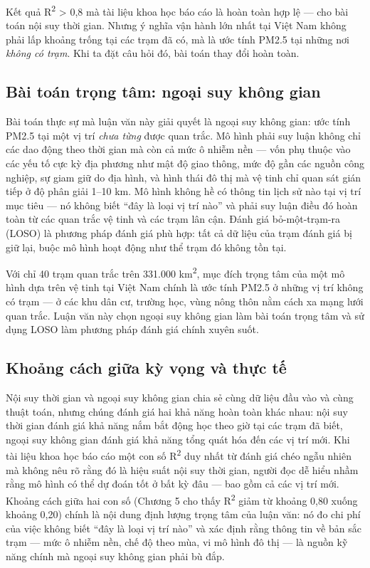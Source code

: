 Kết quả R\textsuperscript{2} > 0,8 mà tài liệu khoa học báo cáo là hoàn toàn hợp lệ --- cho bài toán nội suy thời gian. Nhưng ý nghĩa vận hành lớn nhất tại Việt Nam không phải lấp khoảng trống tại các trạm đã có, mà là ước tính PM2.5 tại những nơi \emph{không có trạm}. Khi ta đặt câu hỏi đó, bài toán thay đổi hoàn toàn.

\subsection{Bài toán trọng tâm: ngoại suy không gian}

Bài toán thực sự mà luận văn này giải quyết là ngoại suy không gian: ước tính PM2.5 tại một vị trí \emph{chưa từng} được quan trắc. Mô hình phải suy luận không chỉ các dao động theo thời gian mà còn cả mức ô nhiễm nền --- vốn phụ thuộc vào các yếu tố cực kỳ địa phương như mật độ giao thông, mức độ gần các nguồn công nghiệp, sự giam giữ do địa hình, và hình thái đô thị mà vệ tinh chỉ quan sát gián tiếp ở độ phân giải 1--10 km. Mô hình không hề có thông tin lịch sử nào tại vị trí mục tiêu --- nó không biết ``đây là loại vị trí nào'' và phải suy luận điều đó hoàn toàn từ các quan trắc vệ tinh và các trạm lân cận. Đánh giá bỏ-một-trạm-ra (LOSO) là phương pháp đánh giá phù hợp: tất cả dữ liệu của trạm đánh giá bị giữ lại, buộc mô hình hoạt động như thể trạm đó không tồn tại.

Với chỉ 40 trạm quan trắc trên 331.000 km\textsuperscript{2}, mục đích trọng tâm của một mô hình dựa trên vệ tinh tại Việt Nam chính là ước tính PM2.5 ở những vị trí không có trạm --- ở các khu dân cư, trường học, vùng nông thôn nằm cách xa mạng lưới quan trắc. Luận văn này chọn ngoại suy không gian làm bài toán trọng tâm và sử dụng LOSO làm phương pháp đánh giá chính xuyên suốt.

\subsection{Khoảng cách giữa kỳ vọng và thực tế}

Nội suy thời gian và ngoại suy không gian chia sẻ cùng dữ liệu đầu vào và cùng thuật toán, nhưng chúng đánh giá hai khả năng hoàn toàn khác nhau: nội suy thời gian đánh giá khả năng nắm bắt động học theo giờ tại các trạm đã biết, ngoại suy không gian đánh giá khả năng tổng quát hóa đến các vị trí mới. Khi tài liệu khoa học báo cáo một con số R\textsuperscript{2} duy nhất từ đánh giá chéo ngẫu nhiên mà không nêu rõ rằng đó là hiệu suất nội suy thời gian, người đọc dễ hiểu nhầm rằng mô hình có thể dự đoán tốt ở bất kỳ đâu --- bao gồm cả các vị trí mới. Khoảng cách giữa hai con số (Chương 5 cho thấy R\textsuperscript{2} giảm từ khoảng 0,80 xuống khoảng 0,20) chính là nội dung định lượng trọng tâm của luận văn: nó đo chi phí của việc không biết ``đây là loại vị trí nào'' và xác định rằng thông tin về bản sắc trạm --- mức ô nhiễm nền, chế độ theo mùa, vi mô hình đô thị --- là nguồn kỹ năng chính mà ngoại suy không gian phải bù đắp.


